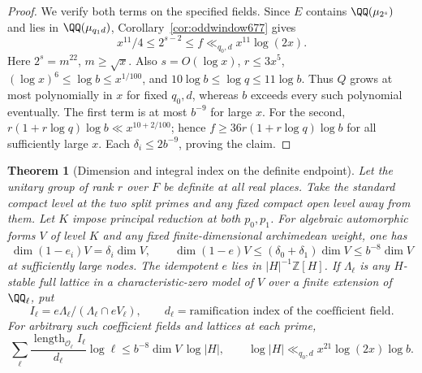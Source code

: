 \documentclass[a4paper,11pt]{article}
\newtheorem{theorem}[proposition]{Theorem}
\theoremstyle{definition}
\theoremstyle{remark}
\newcommand{\ZZ}{\mathbb Z}\newcommand{\ord}{\operatorname{ord}}
\newcommand{\len}{\operatorname{length}}\newcommand{\Res}{\operatorname*{Res}}
\numberwithin{equation}{section}
\begin{document}
\begin{proof}
We verify both terms on the specified fields. Since \(E\)
contains \(\QQ(\mu_{2^s})\) and lies in \(\QQ(\mu_{q_1d})\),
Corollary~\ref{cor:oddwindow677} gives
\[
         x^{11}/4\le 2^{s-2}\le f
                   \ll_{q_0,d}x^{11}\log(2x).
\]
Here \(2^s=m^{22}\), \(m\ge\sqrt{x}\). Also \(s=O(\log x)\),
\(r\le3x^5\), \((\log x)^6\le\log b\le x^{1/100}\), and
\(10\log b\le\log q\le11\log b\).
Thus \(Q\) grows at most polynomially in \(x\) for fixed
\(q_0,d\), whereas \(b\) exceeds every such polynomial
eventually. The first term is at most \(b^{-9}\) for large
\(x\). For the second, \(r(1+r\log q)\log b\ll x^{10+2/100}\);
hence \(f\ge 36r(1+r\log q)\log b\) for all sufficiently
large \(x\). Each \(\delta_i\le2b^{-9}\), proving the claim.
\end{proof}

\begin{theorem}[Dimension and integral index on the definite endpoint]
\leavevmode\label{thm:definitelevels678}
Let the unitary group of rank \(r\) over \(F\) be definite at
all real places. Take the standard compact level at the two
split primes and any fixed compact open level away from them.
Let \(K\) impose principal reduction at both \(p_0,p_1\).
For algebraic automorphic forms \(V\) of level \(K\) and any
fixed finite-dimensional archimedean weight, one has
\[
 \dim (1-e_i)V=\delta_i\dim V,\qquad
 \dim(1-e)V\le(\delta_0+\delta_1)\dim V\le b^{-8}\dim V
\]
at sufficiently large nodes. The idempotent \(e\) lies in
\(|H|^{-1}\ZZ[H]\). If \(\Lambda_\ell\) is any \(H\)-stable
full lattice in a characteristic-zero model of \(V\) over a
finite extension of \(\QQ_\ell\), put
\[
 I_\ell=e\Lambda_\ell/(\Lambda_\ell\cap eV_\ell),\qquad
 d_\ell=\text{ramification index of the coefficient field}.
\]
For arbitrary such coefficient fields and lattices at each prime,
\[
  \sum_\ell\frac{\len_{\mathcal O_\ell}I_\ell}{d_\ell}\log\ell
       \le b^{-8}\dim V\,\log |H|,\qquad
  \log|H|\ll_{q_0,d}x^{21}\log(2x)\log b .
\]
\end{theorem}
\end{document}

